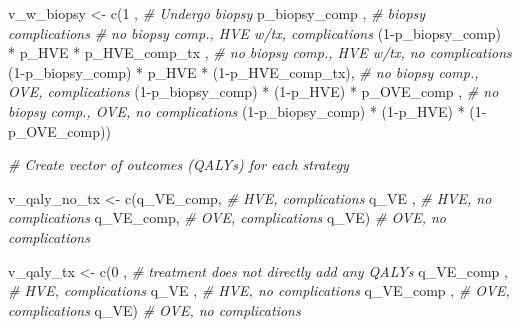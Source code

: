 \documentclass[
]{article}
\newenvironment{Shaded}{\begin{snugshade}}{\end{snugshade}}
\newcommand{\CommentTok}[1]{\textcolor[rgb]{0.56,0.35,0.01}{\textit{#1}}}
\newcommand{\DecValTok}[1]{\textcolor[rgb]{0.00,0.00,0.81}{#1}}
\newcommand{\FunctionTok}[1]{\textcolor[rgb]{0.00,0.00,0.00}{#1}}
\newcommand{\NormalTok}[1]{#1}
\newcommand{\OtherTok}[1]{\textcolor[rgb]{0.56,0.35,0.01}{#1}}
\newcommand{\SpecialCharTok}[1]{\textcolor[rgb]{0.00,0.00,0.00}{#1}}
\begin{document}
\begin{Shaded}
\begin{Highlighting}[]
\NormalTok{  v\_w\_biopsy }\OtherTok{\textless{}{-}} \FunctionTok{c}\NormalTok{(}\DecValTok{1}\NormalTok{                                     , }\CommentTok{\# Undergo biopsy}
\NormalTok{                  p\_biopsy\_comp                         , }\CommentTok{\# biopsy complications}
                 \CommentTok{\# no biopsy comp., HVE w/tx,  complications}
\NormalTok{                 (}\DecValTok{1}\SpecialCharTok{{-}}\NormalTok{p\_biopsy\_comp) }\SpecialCharTok{*}\NormalTok{    p\_HVE  }\SpecialCharTok{*}\NormalTok{    p\_HVE\_comp\_tx ,  }
                 \CommentTok{\# no biopsy comp., HVE w/tx, no complications}
\NormalTok{                 (}\DecValTok{1}\SpecialCharTok{{-}}\NormalTok{p\_biopsy\_comp) }\SpecialCharTok{*}\NormalTok{    p\_HVE  }\SpecialCharTok{*}\NormalTok{ (}\DecValTok{1}\SpecialCharTok{{-}}\NormalTok{p\_HVE\_comp\_tx),  }
                 \CommentTok{\# no biopsy comp., OVE, complications}
\NormalTok{                 (}\DecValTok{1}\SpecialCharTok{{-}}\NormalTok{p\_biopsy\_comp) }\SpecialCharTok{*}\NormalTok{ (}\DecValTok{1}\SpecialCharTok{{-}}\NormalTok{p\_HVE) }\SpecialCharTok{*}\NormalTok{    p\_OVE\_comp    ,  }
                 \CommentTok{\# no biopsy comp., OVE, no complications}
\NormalTok{                 (}\DecValTok{1}\SpecialCharTok{{-}}\NormalTok{p\_biopsy\_comp) }\SpecialCharTok{*}\NormalTok{ (}\DecValTok{1}\SpecialCharTok{{-}}\NormalTok{p\_HVE) }\SpecialCharTok{*}\NormalTok{ (}\DecValTok{1}\SpecialCharTok{{-}}\NormalTok{p\_OVE\_comp))      }
  
  \CommentTok{\# Create vector of outcomes (QALYs) for each strategy }
  
\NormalTok{  v\_qaly\_no\_tx  }\OtherTok{\textless{}{-}} \FunctionTok{c}\NormalTok{(q\_VE\_comp, }\CommentTok{\# HVE, complications}
\NormalTok{                     q\_VE     , }\CommentTok{\# HVE, no complications}
\NormalTok{                     q\_VE\_comp, }\CommentTok{\# OVE, complications}
\NormalTok{                     q\_VE)      }\CommentTok{\# OVE, no complications}
  
\NormalTok{  v\_qaly\_tx     }\OtherTok{\textless{}{-}} \FunctionTok{c}\NormalTok{(}\DecValTok{0}\NormalTok{         , }\CommentTok{\# treatment does not directly add any QALYs }
\NormalTok{                     q\_VE\_comp , }\CommentTok{\# HVE, complications}
\NormalTok{                     q\_VE      , }\CommentTok{\# HVE, no complications}
\NormalTok{                     q\_VE\_comp , }\CommentTok{\# OVE, complications}
\NormalTok{                     q\_VE)       }\CommentTok{\# OVE, no complications}
  

\end{Highlighting}
\end{Shaded}
\end{document}

